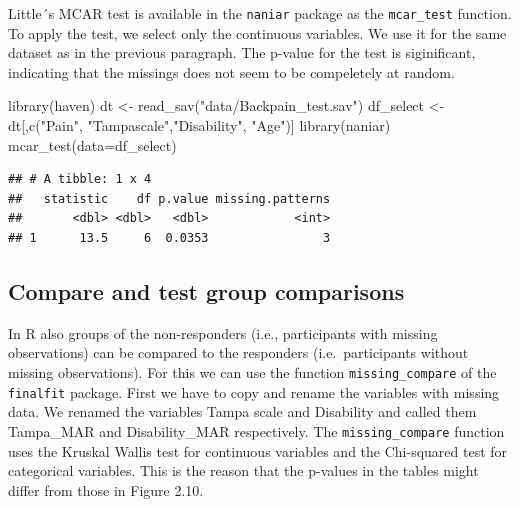 \documentclass[
]{book}
\newenvironment{Shaded}{\begin{snugshade}}{\end{snugshade}}
\newcommand{\AttributeTok}[1]{\textcolor[rgb]{0.77,0.63,0.00}{#1}}
\newcommand{\FunctionTok}[1]{\textcolor[rgb]{0.00,0.00,0.00}{#1}}
\newcommand{\NormalTok}[1]{#1}
\newcommand{\OtherTok}[1]{\textcolor[rgb]{0.56,0.35,0.01}{#1}}
\newcommand{\StringTok}[1]{\textcolor[rgb]{0.31,0.60,0.02}{#1}}
\begin{document}
Little´s MCAR test is available in the \texttt{naniar} package as the \texttt{mcar\_test} function. To apply the test, we select only the continuous variables. We use it for the same dataset as in the previous paragraph. The p-value for the test is siginificant, indicating that the missings does not seem to be compeletely at random.

\begin{Shaded}
\begin{Highlighting}[]
\FunctionTok{library}\NormalTok{(haven)}
\NormalTok{dt }\OtherTok{\textless{}{-}} \FunctionTok{read\_sav}\NormalTok{(}\StringTok{"data/Backpain\_test.sav"}\NormalTok{)}
\NormalTok{df\_select }\OtherTok{\textless{}{-}}\NormalTok{ dt[,}\FunctionTok{c}\NormalTok{(}\StringTok{"Pain"}\NormalTok{, }\StringTok{"Tampascale"}\NormalTok{,}\StringTok{"Disability"}\NormalTok{, }\StringTok{"Age"}\NormalTok{)]}
\FunctionTok{library}\NormalTok{(naniar)}
\FunctionTok{mcar\_test}\NormalTok{(}\AttributeTok{data=}\NormalTok{df\_select)}
\end{Highlighting}
\end{Shaded}

\begin{verbatim}
## # A tibble: 1 x 4
##   statistic    df p.value missing.patterns
##       <dbl> <dbl>   <dbl>            <int>
## 1      13.5     6  0.0353                3
\end{verbatim}

\hypertarget{compare-and-test-group-comparisons-1}{%
\subsection{Compare and test group comparisons}\label{compare-and-test-group-comparisons-1}}

In R also groups of the non-responders (i.e., participants with missing observations) can be compared to the responders (i.e.~participants without missing observations). For this we can use the function \texttt{missing\_compare} of the \texttt{finalfit} package. First we have to copy and rename the variables with missing data. We renamed the variables Tampa scale and Disability and called them Tampa\_MAR and Disability\_MAR respectively. The \texttt{missing\_compare} function uses the Kruskal Wallis test for continuous variables and the Chi-squared test for categorical variables. This is the reason that the p-values in the tables might differ from those in Figure 2.10.
\end{document}
